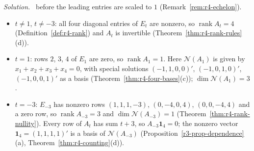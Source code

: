 \documentclass[12pt]{article}
\newcommand{\one}{\mathbf 1}
\DeclareMathOperator{\rank}{rank}
\theoremstyle{definition}
\newenvironment{solution}{\par\noindent\textit{Solution.}\ }{\par\smallskip}
\begin{document}
\begin{solution}
before the leading entries are scaled to \(1\) (Remark~\ref{rem:r4-echelon}).
\begin{itemize}
\item \(t\ne1\), \(t\ne-3\): all four diagonal entries of \(E_t\) are nonzero, so \(\rank A_t=4\)
(Definition~\ref{def:r4-rank}) and
\(A_t\) is invertible (Theorem~\ref{thm:r4-rank-rules}(d)).
\item \(t=1\): rows \(2\), \(3\), \(4\) of \(E_1\) are zero, so \(\rank A_1=1\). Here \(\mathcal N(A_1)\)
is given by \(x_1+x_2+x_3+x_4=0\), with special solutions \((-1,1,0,0)'\), \((-1,0,1,0)'\),
\((-1,0,0,1)'\) as a basis (Theorem~\ref{thm:r4-four-bases}(c)); \(\dim\mathcal N(A_1)=3\).
\item \(t=-3\): \(E_{-3}\) has nonzero rows \((1,1,1,-3)\), \((0,-4,0,4)\), \((0,0,-4,4)\) and a zero
row, so \(\rank A_{-3}=3\) and \(\dim\mathcal N(A_{-3})=1\) (Theorem~\ref{thm:r4-rank-nullity}).
Every row of \(A_t\) has sum \(t+3\), so \(A_{-3}\one_4=0\); the nonzero vector \(\one_4=(1,1,1,1)'\)
is a basis of \(\mathcal N(A_{-3})\) (Proposition~\ref{r3-prop-dependence}(a),
Theorem~\ref{thm:r4-counting}(d)).
\end{itemize}
\end{solution}
\end{document}

